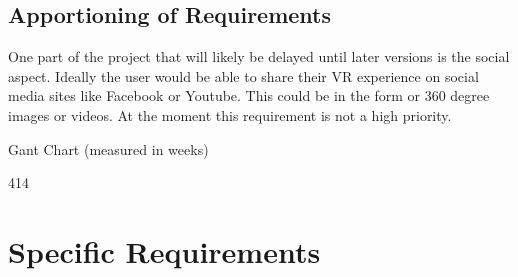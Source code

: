 \documentclass[10pt,journal,compsoc,onecolumn, draftclsnofoot]{IEEEtran}
\begin{document}
\begin{bibunit}
\subsection{Apportioning of Requirements}
One part of the project that will likely be delayed until later versions is the
social aspect. Ideally the user would be able to share their VR experience on
social media sites like Facebook or Youtube. This could be in the form or 360
degree images or videos. At the moment this requirement is not a high priority.

\vspace{1cm}

Gant Chart (measured in weeks)
\begin{flushright}
\begin{PstGanttChart}[ChartShowIntervals,ChartUnitIntervalName=]{3}{12}
\end{PstGanttChart}
\end{flushright}
\vspace{0.5cm}
\begin{flushright}
\begin{PstGanttChart}[ChartShowIntervals,ChartUnitIntervalName=,ChartStartInterval=13]{4}{14}
\end{PstGanttChart}
\end{flushright}

\section{Specific Requirements}

\end{bibunit}
\end{document}
